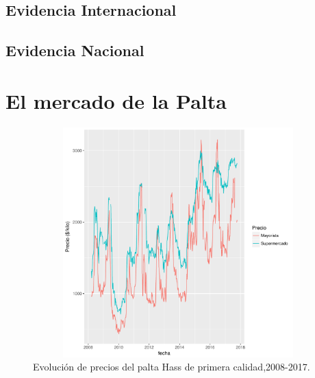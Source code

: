 \documentclass[12pt, twoside]{book}\usepackage[]{graphicx}\usepackage[]{color}
\newenvironment{knitrout}{}{} %
\numberwithin{equation}{section}
\numberwithin{theorem}{section}
\numberwithin{teorema}{section}
\numberwithin{defi}{section}
\numberwithin{prop}{section}
\numberwithin{defi}{section}
\theoremstyle{plain}
\begin{document}
\section{Evidencia Internacional}
\section{Evidencia Nacional}


\chapter{El mercado de la Palta}








\begin{knitrout}
\color{fgcolor}\begin{figure}[H]

{\centering \includegraphics[width=6.5in,height=3.5in]{figure/fig-1-1} 

}

\caption[Evolución de precios del palta Hass de primera calidad,2008-2017]{Evolución de precios del palta Hass de primera calidad,2008-2017.}\label{fig:fig-1}
\end{figure}


\end{knitrout}
\end{document}
